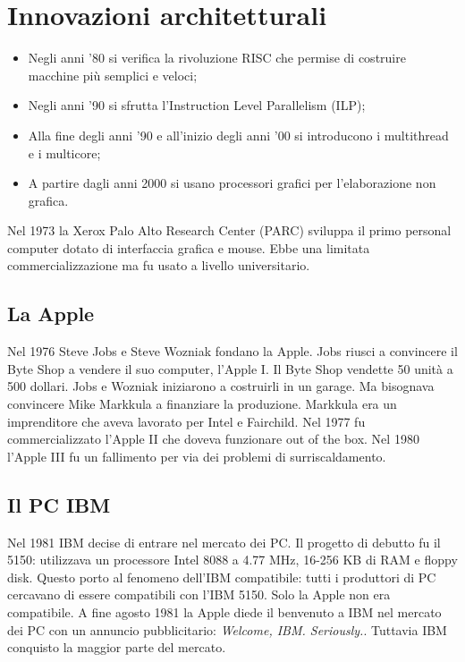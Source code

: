 \section{Innovazioni architetturali}

\begin{itemize}
    \item Negli anni '80 si verifica la rivoluzione RISC che permise di
    costruire macchine più semplici e veloci;
    \item Negli anni '90 si sfrutta l'Instruction Level Parallelism (ILP);
    \item Alla fine degli anni '90 e all'inizio degli anni '00 si introducono
    i multithread e i multicore;
    \item A partire dagli anni 2000 si usano processori grafici per l'elaborazione non grafica.
\end{itemize}

Nel 1973 la Xerox Palo Alto Research Center (PARC) sviluppa il primo personal computer
dotato di interfaccia grafica e mouse. Ebbe una limitata commercializzazione ma fu usato
a livello universitario. 

\subsection{La Apple}

Nel 1976 Steve Jobs e Steve Wozniak fondano la Apple. Jobs riusci a convincere il Byte
Shop a vendere il suo computer, l'Apple I. Il Byte Shop vendette 50 unità a 500 dollari.
Jobs e Wozniak iniziarono a costruirli in un garage. Ma bisognava convincere Mike
Markkula a finanziare la produzione. Markkula era un imprenditore che aveva lavorato
per Intel e Fairchild. 
Nel 1977 fu commercializzato l'Apple II che doveva funzionare out of the box.
Nel 1980 l'Apple III fu un fallimento per via dei problemi di surriscaldamento.

\subsection{Il PC IBM}

Nel 1981 IBM decise di entrare nel mercato dei PC. 
Il progetto di debutto fu il 5150: utilizzava un 
processore Intel 8088 a 4.77 MHz, 16-256 KB di RAM e 
floppy disk.
Questo porto al fenomeno dell'IBM compatibile:
tutti i produttori di PC cercavano di essere compatibili
con l'IBM 5150. Solo la Apple non era compatibile.
A fine agosto 1981 la Apple diede il benvenuto a IBM
nel mercato dei PC con un annuncio pubblicitario:
\textit{Welcome, IBM. Seriously.}. Tuttavia IBM 
conquisto la maggior parte del mercato.

